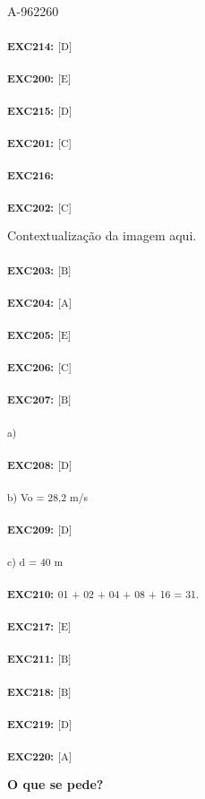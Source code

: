 \begin{questao}{A-962260}
{\textsubscript{\textbf{EXC214:}} \textsubscript{[D] }

\textsubscript{\textbf{EXC200:}} \textsubscript{[E] }

\textsubscript{\textbf{EXC215:}} \textsubscript{[D] }

\textsubscript{\textbf{EXC201:}} \textsubscript{[C] }

\textsubscript{\textbf{EXC216: }}

\textsubscript{\textbf{EXC202:}} \textsubscript{[C] }


Contextualização da imagem aqui.

\textsubscript{\textbf{EXC203:}} \textsubscript{[B] }

\textsubscript{\textbf{EXC204:}} \textsubscript{[A] }

\textsubscript{\textbf{EXC205:}} \textsubscript{[E] }

\textsubscript{\textbf{EXC206:}} \textsubscript{[C] }

\textsubscript{\textbf{EXC207:}} \textsubscript{[B] }

\textsubscript{a) }

\textsubscript{\textbf{EXC208:}} \textsubscript{[D] }

\textsubscript{ b) Vo = 28,2 m/s }

\textsubscript{\textbf{EXC209:}} \textsubscript{[D] }

\textsubscript{ c) d = 40 m }

\textsubscript{\textbf{EXC210:}} \textsubscript{01 + 02 + 04 + 08 + 16 = 31. }

\textsubscript{\textbf{EXC217:}} \textsubscript{[E] }

\textsubscript{\textbf{EXC211:}} \textsubscript{[B] }

\textsubscript{\textbf{EXC218:}} \textsubscript{[B] }

\textsubscript{\textbf{EXC219:}} \textsubscript{[D] }

\textsubscript{\textbf{EXC220:}} \textsubscript{[A]}

\textbf{O que se pede?}
  }

\end{questao}

